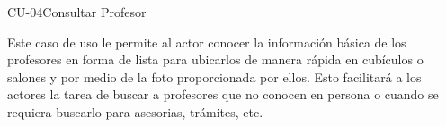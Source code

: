 \begin{UseCase}{CU-04}{Consultar Profesor}
    {
	Este caso de uso le permite al actor conocer la información básica de los profesores en forma de lista para ubicarlos de manera rápida en cubículos o salones y por medio de la foto proporcionada por ellos. Esto facilitará a los actores la tarea de buscar a profesores que no conocen en persona o cuando se requiera buscarlo para asesorias, trámites, etc.
	
    }


%			


\end{UseCase}
